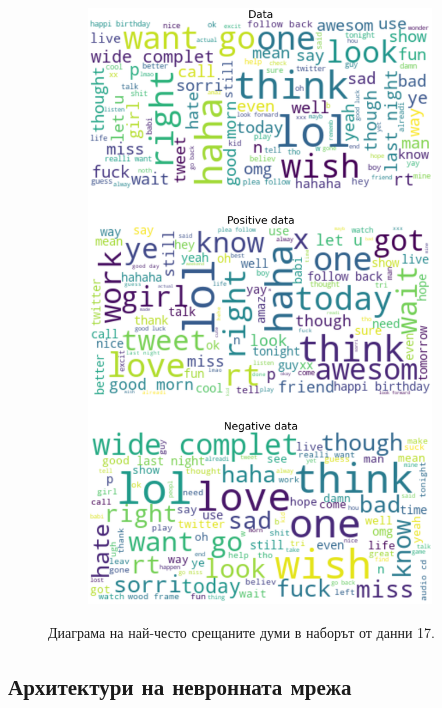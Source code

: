 \documentclass{article}
\begin{document}
\begin{itemize}
\begin{figure}[H]
\begin{subfigure}[b]{0.24\textwidth}
      \includegraphics[width=\textwidth]{chapter-06/section-01-01/17/visualization/4/wordcloud.png}
    \end{subfigure}
    \caption{Диаграма на най-често срещаните думи в наборът от данни 17.}
  \end{figure}

\end{itemize}

\subsection{Архитектури на невронната мрежа}
\end{document}
